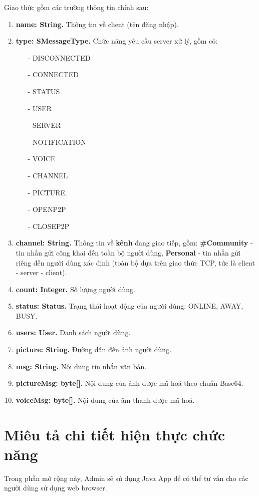 \documentclass[a4paper]{article}
\begin{document}
Giao thức gồm các trường thông tin chính sau:
\begin{enumerate}
	\item {\bf name: String.} Thông tin về client (tên đăng nhập).
	\item {\bf type: SMessageType.} Chức năng yêu cầu server xử lý, gồm có: 
	\begin{itemize}
		\item[-] DISCONNECTED
		\item[-] CONNECTED 
		\item[-] STATUS
		\item[-] USER
		\item[-] SERVER
		\item[-] NOTIFICATION
		\item[-] VOICE
		\item[-] CHANNEL
		\item[-] PICTURE.
		\item[-] OPENP2P
		\item[-] CLOSEP2P
	\end{itemize}
	\item {\bf channel: String.} Thông tin về {\bf kênh} đang giao tiếp, gồm: {\bf \#Community} - tin nhắn gửi công khai đến toàn bộ người dùng, {\bf Personal} - tin nhắn gửi riêng đến người dùng xác định (toàn bộ dựa trên giao thức TCP, tức là client - server - client).
	\item {\bf count: Integer.} Số lượng người dùng.
	\item {\bf status: Status.} Trạng thái hoạt động của người dùng: ONLINE, AWAY, BUSY.
	\item {\bf users: User.} Danh sách người dùng.
	\item {\bf picture: String.} Đường dẫn đến ảnh người dùng.
	\item {\bf msg: String.} Nội dung tin nhắn văn bản.
	\item {\bf pictureMsg: byte[].} Nội dung của ảnh được mã hoá theo chuẩn Base64.
	\item {\bf voiceMsg: byte[].} Nội dung của âm thanh được mã hoá.
\end{enumerate}

 \section{Miêu tả chi tiết hiện thực chức năng}

Trong phần mở rộng này, Admin sẽ sử dụng Java App để có thể tư vấn cho các người dùng sử dụng web browser.
\end{document}
